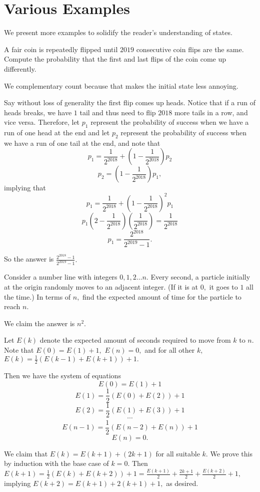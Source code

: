 \documentclass[mast]{lucky}
\begin{document}
\section{Various Examples}
We present more examples to solidify the reader's understanding of states.

\begin{exam}
A fair coin is repeatedly flipped until $2019$ consecutive coin flips are the same. Compute the probability that the first and last flips of the coin come up differently.
\end{exam}

\begin{sol}
We complementary count because that makes the initial state less annoying.

Say without loss of generality the first flip comes up heads. Notice that if a run of heads breaks, we have $1$ tail and thus need to flip $2018$ more tails in a row, and vice versa. Therefore, let $p_1$ represent the probability of success when we have a run of one head at the end and let $p_2$ represent the probability of success when we have a run of one tail at the end, and note that
\[p_1=\frac{1}{2^{2018}}+(1-\frac{1}{2^{2018}})p_2\]
\[p_2=(1-\frac{1}{2^{2018}})p_1,\]
implying that
\[p_1=\frac{1}{2^{2018}}+(1-\frac{1}{2^{2018}})^2p_1\]
\[p_1(2-\frac{1}{2^{2018}})(\frac{1}{2^{2018}})=\frac{1}{2^{2018}}\]
\[p_1=\frac{2^{2018}}{2^{2019}-1}.\]

So the answer is $\frac{2^{2018}-1}{2^{2019}-1}.$
\end{sol}

\begin{exam}
Consider a number line with integers $0,1,2\dots n.$ Every second, a particle initially at the origin randomly moves to an adjacent integer. (If it is at $0,$ it goes to $1$ all the time.) In terms of $n,$ find the expected amount of time for the particle to reach $n.$
\end{exam}

\begin{sol}
We claim the answer is $n^2.$
    
    Let $E(k)$ denote the expected amount of seconds required to move from $k$ to $n.$ Note that $E(0)=E(1)+1,$ $E(n)=0,$ and for all other $k,$ $E(k)=\frac{1}{2}(E(k-1)+E(k+1))+1.$
    
    Then we have the system of equations
    $$E(0)=E(1)+1$$
    $$E(1)=\frac{1}{2}(E(0)+E(2))+1$$
    $$E(2)=\frac{1}{2}(E(1)+E(3))+1$$
    $$\cdots$$
    $$E(n-1)=\frac{1}{2}(E(n-2)+E(n))+1$$
    $$E(n)=0.$$
    
    We claim that $E(k)=E(k+1)+(2k+1)$ for all suitable $k.$ We prove this by induction with the base case of $k=0.$ Then $E(k+1)=\frac{1}{2}(E(k)+E(k+2))+1=\frac{E(k+1)}{2}+\frac{2k+1}{2}+\frac{E(k+2)}{2}+1,$ implying $E(k+2)=E(k+1)+2(k+1)+1,$ as desired.
\end{sol}
\end{document}
